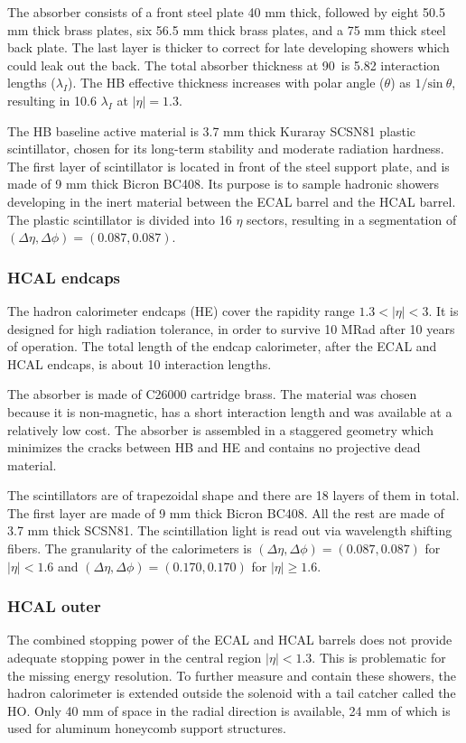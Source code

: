 The absorber consists of a front steel plate 40 mm thick,
followed by eight 50.5 mm thick brass plates, six 56.5 mm thick brass plates,
and a 75 mm thick steel back plate.
The last layer is thicker to correct for late developing showers which could leak out the back.
The total absorber thickness at 90\textdegree~is 5.82 interaction lengths ($\lambda_I$).
The HB effective thickness increases with polar angle ($\theta$) as $1/\textrm{sin}\:\theta$,
resulting in 10.6 $\lambda_I$ at $|\eta| = 1.3$. 

The HB baseline active material is 3.7 mm thick Kuraray SCSN81 plastic scintillator, 
chosen for its long-term stability and moderate radiation hardness. 
The first layer of scintillator is located in front of the steel support plate, 
and is made of 9 mm thick Bicron BC408. 
Its purpose is to sample hadronic showers developing in the inert material between
the ECAL barrel and the HCAL barrel.
The plastic scintillator is divided into 16 $\eta$ sectors, resulting in a segmentation of $(\Delta\eta, \Delta\phi) = (0.087, 0.087)$. 

\subsubsection{HCAL endcaps}

The hadron calorimeter endcaps (HE) cover the rapidity range $1.3 < |\eta| < 3$. 
It is designed for high radiation tolerance, in order to survive 10 MRad after 10 years of operation.
The total length of the endcap calorimeter, after the ECAL and HCAL endcaps, is about 10 interaction lengths. 

The absorber is made of C26000 cartridge brass. The material was chosen because it is non-magnetic, has a short interaction length and was available at a relatively low cost.
The absorber is assembled in a staggered geometry which minimizes the cracks between HB and HE and contains no projective dead material. 

The scintillators are of trapezoidal shape and there are 18 layers of them in total. 
The first layer are made of 9 mm thick Bicron BC408. All the rest are made of 3.7 mm thick SCSN81.
The scintillation light is read out via wavelength shifting fibers. 
The granularity of the calorimeters is $(\Delta\eta, \Delta\phi) = (0.087, 0.087)$ for $|\eta| < 1.6$ and $(\Delta\eta, \Delta\phi) = (0.170, 0.170)$ for $|\eta| \geq 1.6$.

\subsubsection{HCAL outer}
The combined stopping power of the ECAL and HCAL barrels does not provide adequate stopping
power in the central region $|\eta| < 1.3$. This is problematic for the missing energy resolution.
To further measure and contain these showers, the hadron calorimeter is extended outside the solenoid with a tail catcher called the HO. Only 40 mm of space in the radial direction is available, 
24 mm of which is used for aluminum honeycomb support structures.

